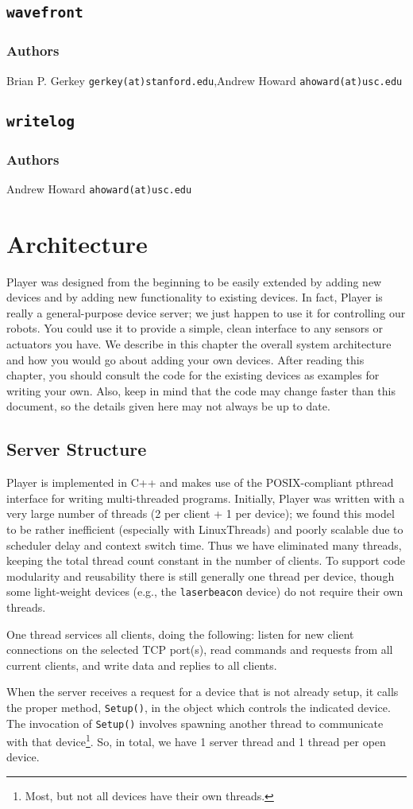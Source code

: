 \documentclass[11pt]{report}
\newcommand{\newdriverex}[2]{\newpage\section{\tt #1} 
  \label{sect:#1_driver} \subsection*{Authors} #2}
\def\gerkey {Brian P. Gerkey {\tt gerkey(at)stanford.edu}}
\def\ahoward {Andrew Howard {\tt ahoward(at)usc.edu}}
\begin{document}
\newdriverex{wavefront}{\gerkey,\ahoward}


\newdriverex{writelog}{\ahoward}



\chapter{Architecture}
\label{chapt:architecture}
Player was designed from the beginning to be easily extended by adding
new devices and by adding new functionality to existing devices.  In fact,
Player is really a general-purpose device server; we just happen to use
it for controlling our robots.  You could use it to provide a simple, clean
interface to any sensors or actuators you have.
We describe in this chapter the overall system architecture and how
you would go about adding your own devices.  After reading this chapter,
you should consult the code for the existing devices as examples for
writing your own.  Also, keep in mind that the code may change faster than 
this document, so the details given here may not always be up to date.

\section{Server Structure}
Player is implemented in C++ and makes use of the POSIX-compliant
pthread interface for writing multi-threaded programs.   Initially, Player
was written with a very large number of threads (2 per client + 1 per device);
we found this model to be rather inefficient (especially with LinuxThreads)
and poorly scalable due to scheduler delay and context switch time.
Thus we have eliminated many threads, keeping the total thread count
constant in the number of clients.  To support code modularity and reusability
there is still generally one thread per device, though some light-weight
devices (e.g., the {\tt laserbeacon} device) do not require their own
threads.

One thread services all clients, doing the following: 
listen for new client connections on the selected TCP port(s),
read commands and requests from all current clients, 
and write data and replies to all clients.

When the server receives a request for a device that is not already setup,
it calls the proper method, {\tt Setup()}, in the object which controls the
indicated device.  The invocation of {\tt Setup()} involves spawning another
thread to communicate with that device\footnote{Most, but not all devices
have their own threads.}.  So, in total, we have 1 server thread and 1 thread
per open device.
\end{document}
